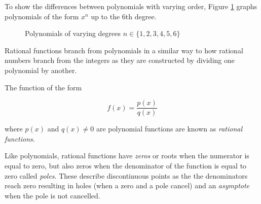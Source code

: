\begin{example} To show the differences between polynomials with varying order, Figure \ref{fig:polynomials} graphs polynomials of the form $x^n$ up to the $6$th degree.

    \begin{figure}[!ht]
        \centering
        \caption{Polynomials of varying degrees $n \in \{1,2,3,4,5,6\}$}
        \label{fig:polynomials}
    \end{figure}
\end{example}

Rational functions branch from polynomials in a similar way to how rational numbers branch from the integers as they are constructed by dividing one polynomial by another.

\begin{definition}
    The function of the form

    \begin{equation}
        f(x) = \frac{p(x)}{q(x)}
    \end{equation}

    \noindent where $p(x)$ and $q(x) \neq 0$ are polynomial functions are known as \textit{rational functions}.
\end{definition}

Like polynomials, rational functions have \textit{zeros} or roots when the numerator is equal to zero, but also zeros when the denominator of the function is equal to zero called \textit{poles}. These describe discontinuous points as the the denominators reach zero resulting in holes (when a zero and a pole cancel) and an \textit{asymptote} when the pole is not cancelled.

